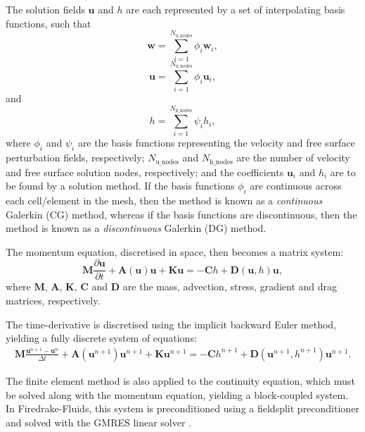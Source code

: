 \documentclass[a4paper,11pt]{report}
\begin{document}
The solution fields $\mathbf{u}$ and $h$ are each represented by a set of interpolating basis functions, such that
\begin{equation}
   \mathbf{w} = \sum_{i=1}^{N_\mathrm{u\_nodes}} \phi_i\mathbf{w}_i,
\end{equation}
\begin{equation}
   \mathbf{u} = \sum_{i=1}^{N_\mathrm{u\_nodes}} \phi_i\mathbf{u}_i,
\end{equation}
and
\begin{equation}
   h = \sum_{i=1}^{N_\mathrm{h\_nodes}} \psi_ih_i,
\end{equation}
where $\phi_i$ and $\psi_i$ are the basis functions representing the velocity and free surface perturbation fields, respectively; $N_\mathrm{u\_nodes}$ and $N_\mathrm{h\_nodes}$ are the number of velocity and free surface solution nodes, respectively; and the coefficients $\mathbf{u}_i$ and $h_i$ are to be found by a solution method. If the basis functions $\phi_i$ are continuous across each cell/element in the mesh, then the method is known as a \textit{continuous} Galerkin (CG) method, whereas if the basis functions are discontinuous, then the method is known as a \textit{discontinuous} Galerkin (DG) method.

The momentum equation, discretised in space, then becomes a matrix system:
\begin{equation}
   \mathbf{M}\frac{\partial\mathbf{u}}{\partial t} + \mathbf{A}(\mathbf{u})\mathbf{u} + \mathbf{K}\mathbf{u} = -\mathbf{C}h + \mathbf{D}(\mathbf{u}, h)\mathbf{u},
\end{equation}
where $\mathbf{M}$, $\mathbf{A}$, $\mathbf{K}$, $\mathbf{C}$ and $\mathbf{D}$ are the mass, advection, stress, gradient and drag matrices, respectively.

The time-derivative is discretised using the implicit backward Euler method, yielding a fully discrete system of equations:
\begin{eqnarray}
   \mathbf{M}\frac{\mathbf{u}^{n+1} - \mathbf{u}^{n}}{\Delta t} + \mathbf{A}(\mathbf{u}^{n+1})\mathbf{u}^{n+1} + \mathbf{K}\mathbf{u}^{n+1} = -\mathbf{C}h^{n+1} + \mathbf{D}(\mathbf{u}^{n+1}, h^{n+1})\mathbf{u}^{n+1}.
\end{eqnarray}

The finite element method is also applied to the continuity equation, which must be solved along with the momentum equation, yielding a block-coupled system. In Firedrake-Fluids, this system is preconditioned using a fieldsplit preconditioner \citep{Brown_etal_2012} and solved with the GMRES linear solver \citep{SaadSchultz_1986}.
\end{document}
